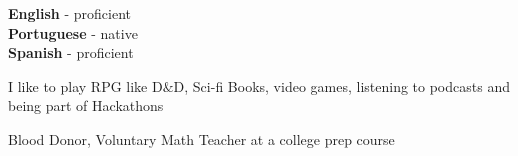 \documentclass[9pt]{developercv} %
\begin{document}

\begin{minipage}[t]{0.3\textwidth}
	\vspace{-\baselineskip} %

	
	\textbf{English} - proficient\\
	\textbf{Portuguese} - native\\
	\textbf{Spanish} - proficient 
\end{minipage}
\hfill
\begin{minipage}[t]{0.3\textwidth}
	\vspace{-\baselineskip} %
	
	
	I like to play RPG like D$\&$D, Sci-fi Books, video games, listening to podcasts and being part of Hackathons
\end{minipage}
\hfill
\begin{minipage}[t]{0.3\textwidth}
	\vspace{-\baselineskip} %
	
	
	Blood Donor, Voluntary Math Teacher at a college prep course
\end{minipage}


\end{document}
